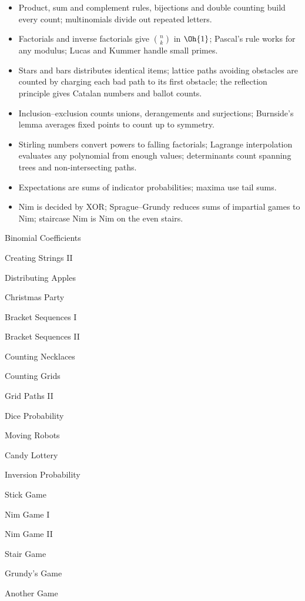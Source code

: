 \begin{summary}
\begin{itemize}
  \item Product, sum and complement rules, bijections and double counting build every count; multinomials divide out repeated letters.
  \item Factorials and inverse factorials give $\binom{n}{k}$ in $\Oh{1}$; Pascal's rule works for any modulus; Lucas and Kummer
        handle small primes.
  \item Stars and bars distributes identical items; lattice paths avoiding obstacles are counted by charging each bad path to its first
        obstacle; the reflection principle gives Catalan numbers and ballot counts.
  \item Inclusion--exclusion counts unions, derangements and surjections; Burnside's lemma averages fixed points to count up to symmetry.
  \item Stirling numbers convert powers to falling factorials; Lagrange interpolation evaluates any polynomial from enough values;
        determinants count spanning trees and non-intersecting paths.
  \item Expectations are sums of indicator probabilities; maxima use tail sums.
  \item Nim is decided by XOR; Sprague--Grundy reduces sums of impartial games to Nim; staircase Nim is Nim on the even stairs.
\end{itemize}
\end{summary}

\begin{practice}
\begin{pplist}
  \item Binomial Coefficients
  \item Creating Strings II
  \item Distributing Apples
  \item Christmas Party
  \item Bracket Sequences I
  \item Bracket Sequences II
  \item Counting Necklaces
  \item Counting Grids
  \item Grid Paths II
\end{pplist}
\begin{pplist}
  \item Dice Probability
  \item Moving Robots
  \item Candy Lottery
  \item Inversion Probability
  \item Stick Game
  \item Nim Game I
  \item Nim Game II
  \item Stair Game
  \item Grundy's Game
  \item Another Game
\end{pplist}
\end{practice}
